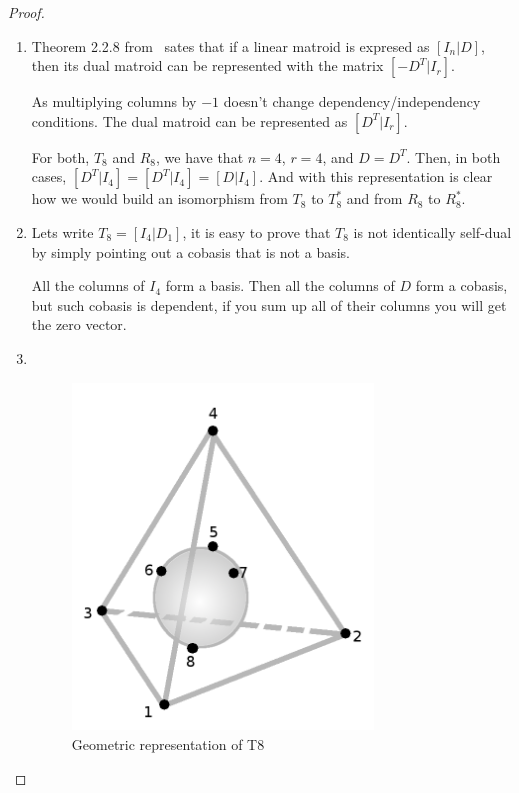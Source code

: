 \begin{proof}$\,$\pn
    \begin{enumerate}[label=(\roman*)]
        \item 
        
            Theorem 2.2.8 from~\cite{Oxley} sates that if a linear matroid is expresed as $[I_n | D]$,
            then its dual matroid can be represented with the matrix $[-D^T | I_r]$.\pn
            
            As multiplying columns by $-1$ doesn't change dependency/independency conditions. The dual matroid can be represented
            as $[D^T | I_r]$.\pn
            
            For both, $T_8$ and $R_8$, we have that $n = 4$, $r = 4$, and $D = D^T$. Then, in both cases, 
            $[D^T | I_4] = [D^T | I_4] = [D | I_4]$. And with this representation is clear how we would build an
            isomorphism from $T_8$ to $T_8^*$ and from $R_8$ to $R_8^*$.
            
        \item
            Lets write $T_8 = [I_4 | D_1]$, it is easy to prove that $T_8$ is not identically self-dual by
            simply pointing out a cobasis that is not a basis.\pn
            
            All the columns of $I_4$ form a basis. Then all the columns of $D$ form a cobasis, but such cobasis is
            dependent, if you sum up all of their columns you will get the zero vector.\pn
        
        \item $\,$\pn
            \begin{figure}[H]
                \begin{center}
                    \includegraphics[width=8cm]{Test2/Problem7/T8GraphicRepresentation.png}
                \end{center}                            
                \caption{Geometric representation of T8}
                \label{t2:p7_T8GraphicRepresentation.png}                        
            \end{figure}\pn 
            

\end{enumerate}
\end{proof}
